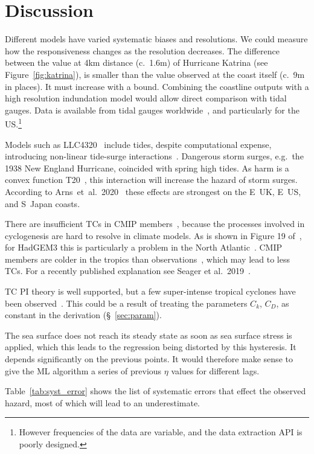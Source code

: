 \section{Discussion}
\label{sec:7_Discussion}

\label{sec:future}

Different models have varied systematic biases
and resolutions. We could measure how
the responsiveness changes as the resolution decreases. The difference
between the value at 4km distance (c.~1.6m) of Hurricane Katrina (see Figure~\ref{fig:katrina}),
is smaller than the value observed at the coast itself (c.~9m in places).
It must increase with a bound.
Combining the coastline outputs with a high resolution indundation model
would allow direct comparison with tidal gauges.
Data is available from tidal gauges worldwide~\cite{tadesse2020data, arns2020non},
and particularly for the US.\footnote{
However frequencies of the data are variable,
and the data extraction API is poorly designed.}

Models such as LLC4320~\cite{Abernathey2017}  include tides,
 despite computational expense,
introducing non-linear tide-surge interactions~\cite{
feng2019characteristics, arns2020non}.
Dangerous storm surges, e.g.~the 1938 New England
Hurricane, coincided with spring high tides.
As harm is a convex function T20~\cite{taleb2019statistical, Taleb2012AntifragileH},
this interaction will increase the hazard of storm surges.
According to Arns~et~al.~2020~\cite{arns2020non}
these effects are strongest on the E~UK,
E~US, and S~Japan coasts.

There are insufficient TCs in CMIP members~\cite{camargo2013global},
because the processes involved
in cyclogenesis are hard to resolve in climate models.
As is shown in Figure 19 of~\cite{williams2018met},
 for HadGEM3 this is particularly a problem in the North Atlantic~\cite{tomassini2017interaction}. %
CMIP members are colder in the tropics than observations~\cite{camargo2013global},
which may lead to less TCs.
For a recently published explanation see Seager et al.~2019~\cite{seager2019strengthening}.


TC PI theory is well supported,
but a few super-intense tropical cyclones have been observed~\cite{camargo2019tropical}.
This could be a result of treating the parameters $C_k$, $C_D$, as constant in the derivation (§~\ref{sec:param}).

The sea surface does not reach its steady state as soon as sea surface
stress is applied, which this leads
to the regression being distorted by this hysteresis.
It depends significantly on the previous points.
It would therefore make sense to give the ML algorithm
a series of previous $\eta$ values for different lags.


\label{sec:sys-errors}
Table~\ref{tab:syst_error} shows the list of systematic errors that effect the
observed hazard, most of which will lead to an underestimate.


